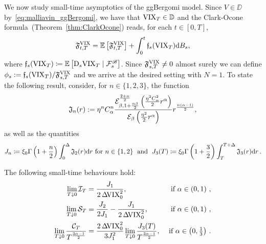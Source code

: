 We now study small-time asymptotics of the ggBergomi model. Since $V\in\DD$ by~\eqref{eq:malliavin_ggBergomi}, we have that $\mathrm{VIX}_T \in \mathbb{D}$ and the Clark-Ocone formula~(Theorem~\ref{thm:ClarkOcone}) %
reads, for each $t \in [0, T]$,
$$
\mathfrak{F}_{t,T}^{\mathrm{VIX}}=\mathbb{E}\left[\mathfrak{F}_{t,T}^{\mathrm{VIX}}\right] + \int_0^t \mathfrak{f}_{s}(\mathrm{VIX}_T) \mathrm{d} B_s,
$$
where $\mathfrak{f}_{s}(\mathrm{VIX}_T)\coloneqq \mathbb{E}\left[\mathrm{D}_s \mathrm{VIX}_T \mid \mathcal{F}^{\mathscr{B}}_s\right]$. Since $\mathfrak{F}_{s,T}^{\mathrm{VIX}} \neq 0$ almost surely we can define $\phi_s:=\mathfrak{f}_{s}(\mathrm{VIX}_T) / \mathfrak{F}_{s,T}^{\mathrm{VIX}}$ and we arrive at the desired setting with $N=1$. To state the following result, consider, 
for $n\in\{1,2,3\}$, the function
$$
\mathfrak{J}_{n}(r) := \eta^n C_{\alpha}^n\frac{\mathcal{E}_{\beta,1+\frac{n\beta}{2}}^{\frac{2+n}{2}} \left(\frac{\eta^2 C_{\alpha}^2}{2}r^{\alpha}\right)}{\mathcal{E}_{\beta}\left(\frac{\eta^2}{2}r^{\alpha}\right)} r^{\frac{n(\alpha-1)}2},
$$
as well as the quantities
$$
J_n \coloneqq  \xi_0 \Gamma\left(1 + \frac{n}{2}\right) \int_0^\Delta \mathfrak{J}_{2}(r) \mathrm{d} r \textup{ for } n\in\{1,2\}\; \textup{ and } \;
J_3(T) \coloneqq \xi_0 \Gamma\left(1 + \frac{3}{2}\right) \int_T^{T+\Delta} \mathfrak{J}_{3}(r) \mathrm{d} r\,.
$$
\begin{proposition}\label{prop:ggBergomi_VIX_asym}
The following small-time behaviours hold:
\begin{equation}
\begin{aligned}
\lim _{T \downarrow 0} \mathcal{I}_T & =\frac{J_1}{2 \operatorname{\Delta\hspace{-0.6mm}\mathrm{VIX}}_0^2}, & \textup{ if } \alpha \in\left(0, 1\right)\,, \\
\lim _{T \downarrow 0} \mathcal{S}_T & =
\frac{J_2}{2J_1} - \frac{J_1}{2\operatorname{\Delta\hspace{-0.6mm}\mathrm{VIX}}_0^2}, & \textup{ if } \alpha \in\left(0, 1\right)\,, \\
\lim _{T \downarrow 0} \frac{\mathcal{C}_T}{T^{\frac{3\alpha-1}{2}}} &= \frac{2 \operatorname{\Delta\hspace{-0.6mm}\mathrm{VIX}}_0^2}{3J_1^2} \lim _{T \downarrow 0} \frac{J_3(T)}{T^{\frac{3\alpha-1}{2}}}, & \textup{ if } \textstyle\alpha \in\left(0, \frac{1}{3}\right)\,.
\end{aligned}
\end{equation}
\end{proposition}
